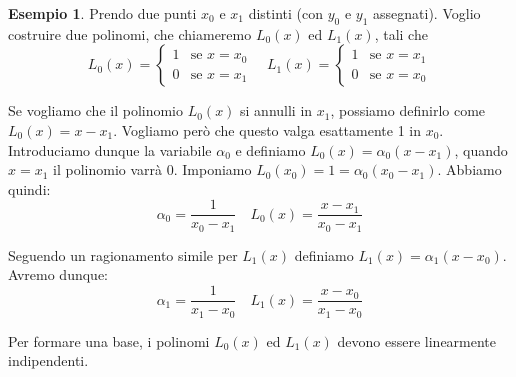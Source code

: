 \documentclass{article}
\theoremstyle{plain}
\theoremstyle{plain}
\theoremstyle{definition}
\theoremstyle{definition}
\newtheorem{esempio}{Esempio}
\begin{document}
\begin{esempio}
	Prendo due punti $x_{0}$ e $x_{1}$ distinti (con $y_{0}$ e $y_{1}$ assegnati).
	Voglio costruire due polinomi, che chiameremo $L_{0}(x)$ ed $L_{1}(x)$, tali che
	\[
	L_{0}(x)=
	\begin{cases}
		1 & \text{se $x=x_{0}$} \\
		0 & \text{se $x=x_{1}$}
	\end{cases}
	\quad
	L_{1}(x)=
	\begin{cases}
		1 & \text{se $x=x_{1}$} \\
		0 & \text{se $x=x_{0}$}
	\end{cases}
	\]
	
	Se vogliamo che il polinomio $L_{0}(x)$ si annulli in $x_{1}$, possiamo definirlo come $L_{0}(x)=x-x_{1}$. Vogliamo però che questo valga esattamente 1 in $x_{0}$. Introduciamo dunque la variabile $\alpha_{0}$ e definiamo $L_{0}(x)=\alpha_{0}(x-x_{1})$, quando $x=x_{1}$ il polinomio varrà $0$. Imponiamo $L_{0}(x_{0})=1=\alpha_{0}(x_{0}-x_{1})$.
	Abbiamo quindi:
	\[
	\alpha_{0}=\frac{1}{x_{0}-x_{1}}
	\quad
	L_{0}(x)=\frac{x-x_{1}}{x_{0}-x_{1}}
	\]
	
	Seguendo un ragionamento simile per $L_{1}(x)$ definiamo $L_{1}(x)=\alpha_{1}(x-x_{0})$. Avremo dunque:
	\[
	\alpha_{1}=\frac{1}{x_{1}-x_{0}}
	\quad
	L_{1}(x)=\frac{x-x_{0}}{x_{1}-x_{0}}
	\]
	
	Per formare una base, i polinomi $L_{0}(x)$ ed $L_{1}(x)$ devono essere linearmente indipendenti.
	
\end{esempio}
\end{document}
